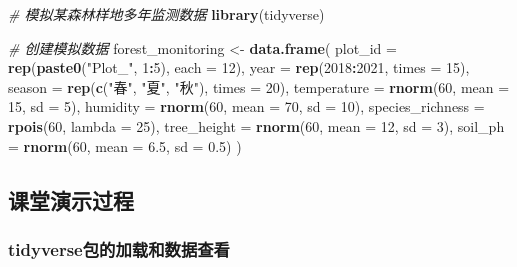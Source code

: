 \documentclass[
  twoside]{book}
\newenvironment{Shaded}{\begin{snugshade}}{\end{snugshade}}
\newcommand{\AttributeTok}[1]{\textcolor[rgb]{0.13,0.29,0.53}{#1}}
\newcommand{\CommentTok}[1]{\textcolor[rgb]{0.56,0.35,0.01}{\textit{#1}}}
\newcommand{\DecValTok}[1]{\textcolor[rgb]{0.00,0.00,0.81}{#1}}
\newcommand{\FloatTok}[1]{\textcolor[rgb]{0.00,0.00,0.81}{#1}}
\newcommand{\FunctionTok}[1]{\textcolor[rgb]{0.13,0.29,0.53}{\textbf{#1}}}
\newcommand{\NormalTok}[1]{#1}
\newcommand{\OtherTok}[1]{\textcolor[rgb]{0.56,0.35,0.01}{#1}}
\newcommand{\SpecialCharTok}[1]{\textcolor[rgb]{0.81,0.36,0.00}{\textbf{#1}}}
\newcommand{\StringTok}[1]{\textcolor[rgb]{0.31,0.60,0.02}{#1}}
\begin{document}
\begin{Shaded}
\begin{Highlighting}[]
\CommentTok{\# 模拟某森林样地多年监测数据}
\FunctionTok{library}\NormalTok{(tidyverse)}

\CommentTok{\# 创建模拟数据}
\NormalTok{forest\_monitoring }\OtherTok{\textless{}{-}} \FunctionTok{data.frame}\NormalTok{(}
  \AttributeTok{plot\_id =} \FunctionTok{rep}\NormalTok{(}\FunctionTok{paste0}\NormalTok{(}\StringTok{"Plot\_"}\NormalTok{, }\DecValTok{1}\SpecialCharTok{:}\DecValTok{5}\NormalTok{), }\AttributeTok{each =} \DecValTok{12}\NormalTok{),}
  \AttributeTok{year =} \FunctionTok{rep}\NormalTok{(}\DecValTok{2018}\SpecialCharTok{:}\DecValTok{2021}\NormalTok{, }\AttributeTok{times =} \DecValTok{15}\NormalTok{),}
  \AttributeTok{season =} \FunctionTok{rep}\NormalTok{(}\FunctionTok{c}\NormalTok{(}\StringTok{"春"}\NormalTok{, }\StringTok{"夏"}\NormalTok{, }\StringTok{"秋"}\NormalTok{), }\AttributeTok{times =} \DecValTok{20}\NormalTok{),}
  \AttributeTok{temperature =} \FunctionTok{rnorm}\NormalTok{(}\DecValTok{60}\NormalTok{, }\AttributeTok{mean =} \DecValTok{15}\NormalTok{, }\AttributeTok{sd =} \DecValTok{5}\NormalTok{),}
  \AttributeTok{humidity =} \FunctionTok{rnorm}\NormalTok{(}\DecValTok{60}\NormalTok{, }\AttributeTok{mean =} \DecValTok{70}\NormalTok{, }\AttributeTok{sd =} \DecValTok{10}\NormalTok{),}
  \AttributeTok{species\_richness =} \FunctionTok{rpois}\NormalTok{(}\DecValTok{60}\NormalTok{, }\AttributeTok{lambda =} \DecValTok{25}\NormalTok{),}
  \AttributeTok{tree\_height =} \FunctionTok{rnorm}\NormalTok{(}\DecValTok{60}\NormalTok{, }\AttributeTok{mean =} \DecValTok{12}\NormalTok{, }\AttributeTok{sd =} \DecValTok{3}\NormalTok{),}
  \AttributeTok{soil\_ph =} \FunctionTok{rnorm}\NormalTok{(}\DecValTok{60}\NormalTok{, }\AttributeTok{mean =} \FloatTok{6.5}\NormalTok{, }\AttributeTok{sd =} \FloatTok{0.5}\NormalTok{)}
\NormalTok{)}
\end{Highlighting}
\end{Shaded}

\hypertarget{ux8bfeux5802ux6f14ux793aux8fc7ux7a0b-8}{%
\subsection{课堂演示过程}\label{ux8bfeux5802ux6f14ux793aux8fc7ux7a0b-8}}

\hypertarget{tidyverseux5305ux7684ux52a0ux8f7dux548cux6570ux636eux67e5ux770b}{%
\subsubsection{tidyverse包的加载和数据查看}\label{tidyverseux5305ux7684ux52a0ux8f7dux548cux6570ux636eux67e5ux770b}}
\end{document}
